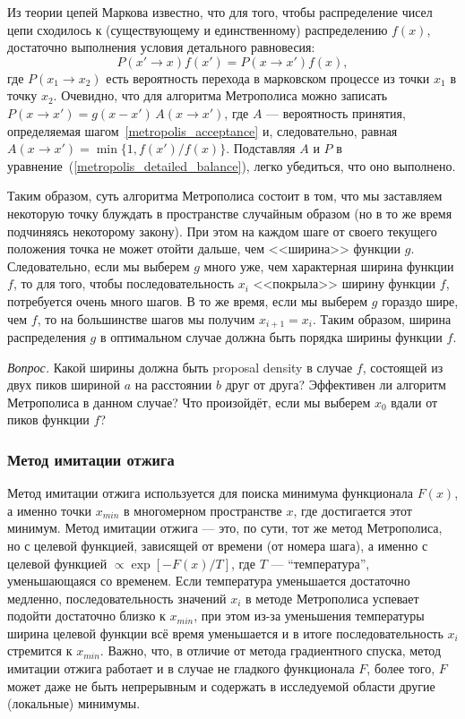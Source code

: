 \documentclass{book}
\begin{document}
Из теории цепей Маркова известно, что для того, чтобы распределение чисел цепи сходилось к
(существующему и единственному) распределению $f(x)$, достаточно выполнения
условия детального равновесия:
\begin{equation}
    \label{metropolis_detailed_balance}
    P(x' \to x) f(x') = P(x \to x') f(x),
\end{equation}
где $P(x_1 \to x_2)$ есть вероятность перехода в марковском процессе из точки $x_1$ в точку $x_2$.
Очевидно, что для алгоритма Метрополиса можно записать $P(x \to x') = g(x - x') \, A(x \to x')$, где
$A$ --- вероятность принятия, определяемая шагом~\ref{metropolis_acceptance} и, следовательно,
равная $A(x \to x') = \min \{1, f(x') / f(x) \}$. Подставляя $A$ и $P$ в
уравнение~(\ref{metropolis_detailed_balance}), легко убедиться, что оно выполнено.

Таким образом, суть алгоритма Метрополиса состоит в том, что мы заставляем некоторую точку блуждать
в пространстве случайным образом (но в то же время подчиняясь некоторому закону). При этом на
каждом шаге от своего текущего положения точка не может отойти дальше, чем <<ширина>> функции $g$.
Следовательно, если мы выберем $g$ много уже, чем характерная ширина функции $f$, то для того,
чтобы последовательность $x_i$ <<покрыла>> ширину функции $f$, потребуется очень много шагов. В то
же время, если мы выберем $g$ гораздо шире, чем $f$, то на большинстве шагов мы получим $x_{i + 1}
= x_i$. Таким образом, ширина распределения $g$ в оптимальном случае должна быть порядка ширины
функции $f$.

\textit{Вопрос.} Какой ширины должна быть proposal density в случае $f$, состоящей из двух пиков
шириной $a$ на расстоянии $b$ друг от друга? Эффективен ли алгоритм Метрополиса в данном случае?
Что произойдёт, если мы выберем $x_0$ вдали от пиков функции $f$?

\subsubsection{Метод имитации отжига}

Метод имитации отжига используется для поиска минимума функционала $F(x)$, а именно точки $x_{min}$
в многомерном пространстве $x$, где достигается этот минимум.  Метод имитации отжига --- это, по
сути, тот же метод Метрополиса, но с целевой функцией, зависящей от времени (от номера шага), а
именно с целевой функцией $\propto \exp[-F(x)/T]$, где $T$ --- ``температура'', уменьшающаяся со
временем. Если температура уменьшается достаточно медленно, последовательность значений $x_i$ в
методе Метрополиса успевает подойти достаточно близко к $x_{min}$, при этом из-за уменьшения
температуры ширина целевой функции всё время уменьшается и в итоге последовательность $x_i$
стремится к $x_{min}$. Важно, что, в отличие от метода градиентного спуска, метод имитации отжига
работает и в случае не гладкого функционала $F$, более того, $F$ может даже не быть непрерывным и
содержать в исследуемой области другие (локальные) минимумы.
\end{document}
